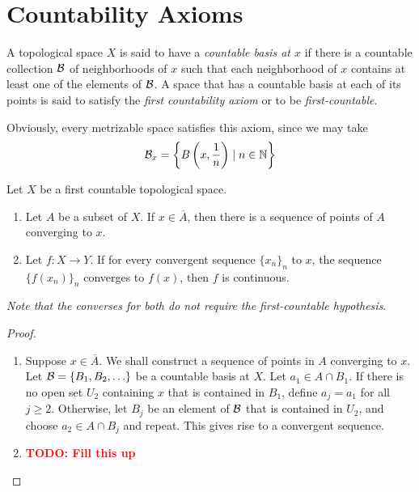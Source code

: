 \section{Countability Axioms}

\begin{definition}
    A topological space $X$ is said to have a \textit{countable basis at $x$} if there is a countable collection $\mathcal{B}$ of neighborhoods of $x$ such that each neighborhood of $x$ contains at least one of the elements of $\mathcal{B}$. A space that has a countable basis at each of its points is said to satisfy the \textit{first countability axiom} or to be \textit{first-countable}.
\end{definition}

Obviously, every metrizable space satisfies this axiom, since we may take 
\begin{equation*}
    \mathcal{B}_x = \left\{B\left(x, \frac{1}{n}\right)\mid n\in\mathbb{N}\right\}
\end{equation*}

\begin{theorem}
    Let $X$ be a first countable topological space. 
    \begin{enumerate}
        \item Let $A$ be a subset of $X$. If $x\in\overline{A}$, then there is a sequence of points of $A$ converging to $x$.

        \item Let $f:X\to Y$. If for every convergent sequence $\{x_n\}_n$ to $x$, the sequence $\{f(x_n)\}_n$ converges to $f(x)$, then $f$ is continuous.
    \end{enumerate}
    \textit{Note that the converses for both do not require the first-countable hypothesis}.
\end{theorem}
\begin{proof}
    \hfill 
    \begin{enumerate}
        \item Suppose $x\in\overline{A}$. We shall construct a sequence of points in $A$ converging to $x$. Let $\mathcal{B} = \{B_1,B_2,\ldots\}$ be a countable basis at $X$. Let $a_1\in A\cap B_1$. If there is no open set $U_2$ containing $x$ that is contained in $B_1$, define $a_j = a_1$ for all $j\ge 2$. Otherwise, let $B_j$ be an element of $\mathcal{B}$ that is contained in $U_2$, and choose $a_2\in A\cap B_j$ and repeat. This gives rise to a convergent sequence.

        \item \textbf{\textcolor{red}{TODO: Fill this up}} 
    \end{enumerate}
\end{proof}

